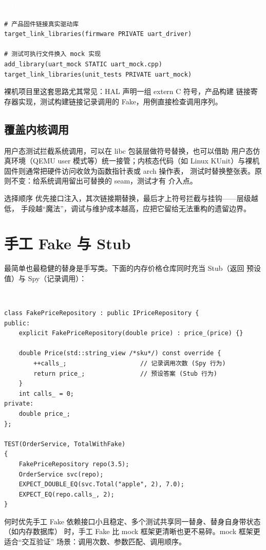 \documentclass[12pt,a4paper,fontset=fandol]{ctexbook}
\newcommand{\cpplabel}{%
  \begin{tcolorbox}[enhanced,colback=cppheadbg,colframe=cppheadbg,
    arc=1mm,boxrule=0mm,left=6pt,right=6pt,top=2pt,bottom=2pt,
    halign=left,oversize]
    \textcolor{white}{\small\bfseries C++}
  \end{tcolorbox}\vspace{-4pt}}
\newcommand{\cmakelabel}{%
  \begin{tcolorbox}[enhanced,colback=cmakeheadbg,colframe=cmakeheadbg,
    arc=1mm,boxrule=0mm,left=6pt,right=6pt,top=2pt,bottom=2pt,
    halign=left,oversize]
    \textcolor{white}{\small\bfseries CMake}
  \end{tcolorbox}\vspace{-4pt}}
\begin{document}
\cmakelabel
\begin{lstlisting}
# 产品固件链接真实驱动库
target_link_libraries(firmware PRIVATE uart_driver)

# 测试可执行文件换入 mock 实现
add_library(uart_mock STATIC uart_mock.cpp)
target_link_libraries(unit_tests PRIVATE uart_mock)
\end{lstlisting}

裸机项目里这套思路尤其常见：HAL 声明一组 extern C 符号，产品构建
链接寄存器实现，测试构建链接记录调用的 Fake，用例直接检查调用序列。

\subsection{覆盖内核调用}

用户态测试拦截系统调用，可以在 libc 包装层做符号替换，也可以借助
用户态仿真环境（QEMU user 模式等）统一接管；内核态代码（如 Linux
KUnit）与裸机固件则通常把硬件访问收敛为函数指针表或 arch 操作表，
测试时替换整张表。原则不变：给系统调用留出可替换的 seam，测试才有
介入点。

\begin{guideline}{选择顺序}
优先接口注入，其次链接期替换，最后才上符号拦截与挂钩——层级越低，
手段越“魔法”，调试与维护成本越高，应把它留给无法重构的遗留边界。
\end{guideline}

\section{手工 Fake 与 Stub}

最简单也最稳健的替身是手写类。下面的内存价格仓库同时充当 Stub（返回
预设值）与 Spy（记录调用）：

\cpplabel
\begin{lstlisting}
class FakePriceRepository : public IPriceRepository {
public:
    explicit FakePriceRepository(double price) : price_(price) {}

    double Price(std::string_view /*sku*/) const override {
        ++calls_;                    // 记录调用次数 (Spy 行为)
        return price_;               // 预设答案 (Stub 行为)
    }
    int calls_ = 0;
private:
    double price_;
};

TEST(OrderService, TotalWithFake)
{
    FakePriceRepository repo(3.5);
    OrderService svc(repo);
    EXPECT_DOUBLE_EQ(svc.Total("apple", 2), 7.0);
    EXPECT_EQ(repo.calls_, 2);
}
\end{lstlisting}

\begin{bestpractice}{何时优先手工 Fake}
依赖接口小且稳定、多个测试共享同一替身、替身自身带状态（如内存数据库）
时，手工 Fake 比 mock 框架更清晰也更不易碎。mock 框架更适合“交互验证”
场景：调用次数、参数匹配、调用顺序。
\end{bestpractice}
\end{document}
